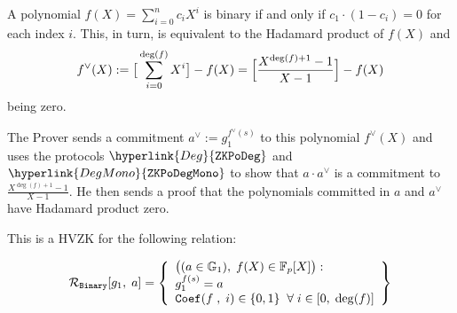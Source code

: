 \documentclass[11pt, lettersize, notitlepage, leqno, footskip=0.6cm]{article}
\newcommand{\bFp}{\mathbb{F}_p}
\newcommand{\mc}{\mathcal}
\newcommand{\mb}{\mathbb}
\newcommand{\vs}{\vspace{-0.15cm}}
\numberwithin{equation}{section}
\begin{document}
A polynomial $f(X) = \sum_{i=0}^n c_iX^i$ is binary if and only if $c_1\cdot (1-c_i) = 0$ for each index $i$. This, in turn, is equivalent to the Hadamard product of $f(X)$ and \vs $$f^{\vee}(X):= \big[\sum\limits_{i=0}^{\deg(f)} X^i\big] - f(X) = \Big[\frac{X^{\deg(f)+1}-1}{X-1}\Big] - f(X)  \vs $$ being zero.

The Prover sends a commitment $a^{\vee}:= g_1^{f^{\vee}(s)}$ to this polynomial $f^{\vee}(X)$ and uses the protocols $\hyperlink{Deg}{\tt{ZKPoDeg}}$ and $\hyperlink{DegMono}{\tt{ZKPoDegMono}}$ to show that $a\cdot a^{\vee}$ is a commitment to $\frac{X^{\deg(f)+1}-1}{X-1}$. He then sends a proof that the polynomials committed in $a$ and $a^{\vee}$ have Hadamard product zero.


This is a HVZK for the following relation: \vs 

$$\mc{R}_{\tt{Binary}}[g_1,\;a] = \left\{\begin{array}{l} \big( (a\in\mb{G}_1),\;
f(X)\in \bFp[X]\big): \\
g_1^{f(s)} = a\\ 
{\tt{Coef}}(f\;,\; i)\in\{0,1\} \;\;\forall\;i\in [0,\;\deg(f)]
\end{array}\right\}  $$





\vspace{2mm}
\end{document}
